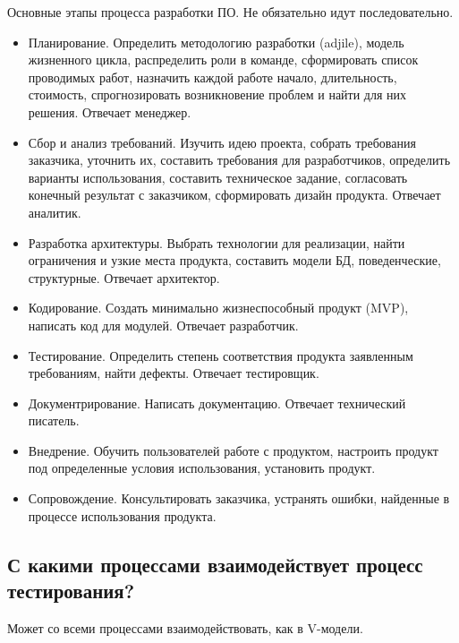 Основные этапы процесса разработки ПО. Не обязательно идут последовательно.
\begin{itemize}
    \item Планирование. Определить методологию разработки (adjile), модель жизненного
        цикла, распределить роли в команде, сформировать список проводимых
        работ, назначить каждой работе начало, длительность, стоимость,
        спрогнозировать возникновение проблем и найти для них решения. Отвечает
        менеджер.

    \item Сбор и анализ требований. Изучить идею проекта, собрать требования
        заказчика, уточнить их, составить требования для разработчиков, определить варианты
        использования, составить техническое задание, согласовать конечный
        результат с заказчиком, сформировать дизайн продукта. Отвечает аналитик.

    \item Разработка архитектуры. Выбрать технологии для реализации, найти
        ограничения и узкие места продукта, составить модели БД, поведенческие,
        структурные. Отвечает архитектор.

    \item Кодирование. Создать минимально жизнеспособный продукт (MVP),
        написать код для модулей. Отвечает разработчик.

    \item Тестирование. Определить степень соответствия продукта заявленным
        требованиям, найти дефекты. Отвечает тестировщик.

    \item Документрирование. Написать документацию. Отвечает технический писатель.

    \item Внедрение. Обучить пользователей работе с продуктом, настроить
        продукт под определенные условия использования, установить продукт.

    \item Сопровождение. Консультировать заказчика, устранять ошибки, найденные
        в процессе использования продукта.
\end{itemize}

\subsection{С какими процессами взаимодействует процесс тестирования?}

Может со всеми процессами взаимодействовать, как в V-модели.

